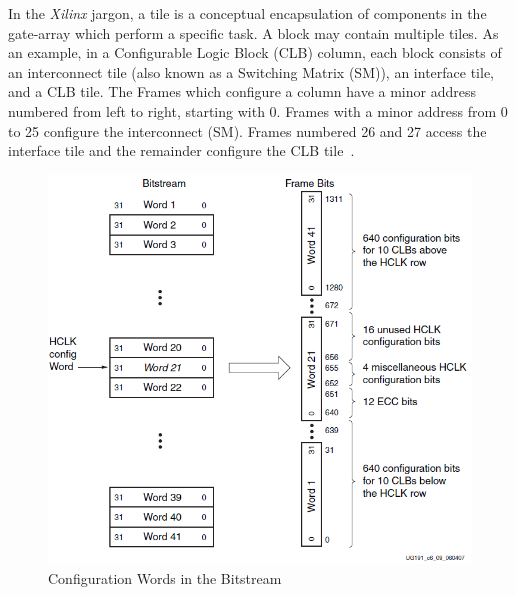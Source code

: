 \documentclass[journal, hidelinks]{IEEEtran}
\begin{document}
In the \textit{Xilinx} jargon, a tile is a conceptual encapsulation of components in the gate-array which perform a specific task.
A block may contain multiple tiles.
As an example, in a Configurable Logic Block (CLB) column, each block consists of an interconnect tile (also known as a Switching Matrix (SM)), an interface tile, and a CLB tile.
The Frames which configure a column have a minor address numbered from left to right, starting with 0.
Frames with a minor address from 0 to 25 configure the interconnect (SM).
Frames numbered 26 and 27 access the interface tile and the remainder configure the CLB tile~\cite{virtex5ConfigGuide}.
\begin{figure}[h]
	\centering
	\includegraphics[width=0.96\linewidth]{Figures/frameTileMap}
	\caption[Configuration Words in the Bitstream~\cite{virtex5ConfigGuide}]{Configuration Words in the Bitstream~\cite{virtex5ConfigGuide}}
	\label{fig:frameTileMap}
\end{figure}
\end{document}
